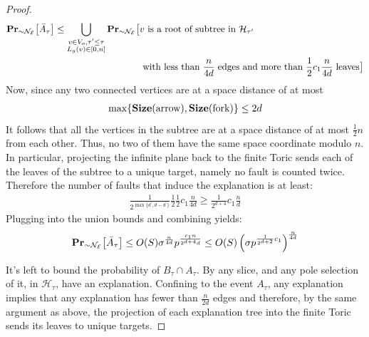 \begin{proof}
  \begin{equation*}
    \begin{split}
      \prbm{ \bar{A}_{\tau} }{ \sim \mathcal{N}_{\mathcal{E}} }  \le  \bigcup_{ \substack{ v \in V_{o}, \tau^{\prime} \le \tau \\ L_{g}(v) \in [0,n]} } \prbm{ & v \text{ is a root of subtree in } \mathcal{H}_{\tau^{\prime}}  \\ 
      &  \text{ with less than  } \frac{n}{4d} \text{ edges and more than } \frac{1}{2}c_{1} \frac{n}{4d} \text{ leaves}  }{ \sim \mathcal{N}_{\mathcal{E}} } 
    \end{split}
  \end{equation*}
    Now, since any two connected vertices are at a space distance of at most 
    \begin{equation*}
      \begin{split}
        \max\{\Size{\text{arrow}}, \Size{\text{fork}}\}  \le 2d
      \end{split}
    \end{equation*} 
    It follows that all the vertices in the subtree are at a space distance of at most $\frac{1}{2} n$ from each other. Thus, no two of them have the same space coordinate modulo $n$. In particular, projecting the infinite plane back to the finite Toric sends each of the leaves of the subtree to a unique target, namely no fault is counted twice. Therefore the number of faults that induce the explanation is at least:
    \begin{equation*}
      \begin{split}
        \frac{1}{2^{\max\{d^{\prime}, d - d^{\prime}\}}} \frac{1}{2} \frac{1}{2}c_{1} \frac{n}{4d} \ge \frac{1}{2^{d+4}} c_{1} \frac{n}{d} 
      \end{split}
    \end{equation*}
Plugging into the union bounds and combining  yields:
    \begin{equation*}
      \begin{split}
        \prbm{  \bar{A}_{\tau}  }{ \sim \mathcal{N}_{\mathcal{E}} }  \le O(S) \sigma^{  \frac{n}{4d} } p^{ \frac{c_{1}n}{2^{d+4} d } }\le O(S) \left( \sigma p^{\frac{1}{2^{d + 2}} c_{1}} \right)^{\frac{n}{4d}} 
      \end{split}
    \end{equation*}

    It's left to bound the probability of $B_{\tau} \cap A_{\tau}$. By  any slice, and any pole selection of it, in $\mathcal{H}_{\tau}$, have an explanation. Confining to the event $A_{\tau}$, any explanation implies that any explanation has fewer than $\frac{n}{2d}$ edges and therefore, by the same argument as above, the projection of each explanation tree into the finite Toric sends its leaves to unique targets.


\end{proof}
